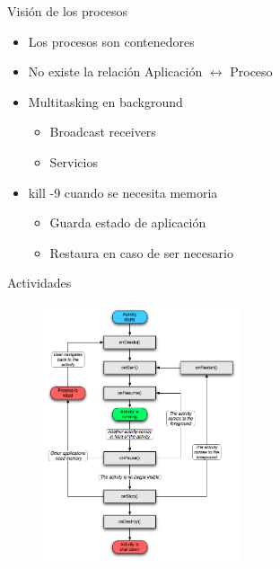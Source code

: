 \documentclass[12pt]{beamer}
\begin{document}
\begin{frame}{Visión de los procesos}
    \begin{itemize}
        \item Los procesos son contenedores
        \item No existe la relación Aplicación $\leftrightarrow$ Proceso
        \item Multitasking en background
        \begin{itemize}
            \item Broadcast receivers
            \item Servicios
        \end{itemize}
        \item kill -9 cuando se necesita memoria
        \begin{itemize}
            \item Guarda estado de aplicación
            \item Restaura en caso de ser necesario
        \end{itemize}
    \end{itemize}
\end{frame}

\begin{frame}{Actividades}
    \center
    \begin{figure}
        \includegraphics[width=5.8cm]{activity_lifecycle.png}
    \end{figure}
\end{frame}
\end{document}

